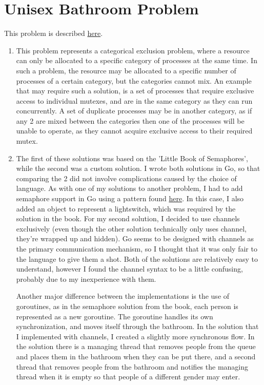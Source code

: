 \documentclass[a4paper,10pt]{article}
\begin{document}
\section{Unisex Bathroom Problem}
This problem is described \href{http://greenteapress.com/semaphores/LittleBookOfSemaphores.pdf#section.6.2}{here}.

\begin{enumerate}
    \item This problem represents a categorical exclusion problem, where a resource can only be allocated to a specific category of processes at the same time. In such a problem, the resource may be allocated to a specific number of processes of a certain category, but the categories cannot mix. An example that may require such a solution, is a set of processes that require exclusive access to individual mutexes, and are in the same category as they can run concurrently. A set of duplicate processes may be in another category, as if any 2 are mixed between the categories then one of the processes will be unable to operate, as they cannot acquire exclusive access to their required mutex.
    \item The first of these solutions was based on the 'Little Book of Semaphores', while the second was a custom solution. I wrote both solutions in Go, so that comparing the 2 did not involve complications caused by the choice of language. As with one of my solutions to another problem, I had to add semaphore support in Go using a pattern found \href{http://www.golangpatterns.info/concurrency/semaphores}{here}. In this case, I also added an object to represent a lightswitch, which was required by the solution in the book. For my second solution, I decided to use channels exclusively (even though the other solution technically only uses channel, they're wrapped up and hidden). Go seems to be designed with channels as the primary communication mechanism, so I thought that it was only fair to the language to give them a shot. Both of the solutions are relatively easy to understand, however I found the channel syntax to be a little confusing, probably due to my inexperience with them.
    
    Another major difference between the implementations is the use of goroutines, as in the semaphore solution from the book, each person is represented as a new goroutine. The goroutine handles its own synchronization, and moves itself through the bathroom. In the solution that I implemented with channels, I created a slightly more synchronous flow. In the solution there is a managing thread that removes people from the queue and places them in the bathroom when they can be put there, and a second thread that removes people from the bathroom and notifies the managing thread when it is empty so that people of a different gender may enter.
\end{enumerate}
\end{document}

